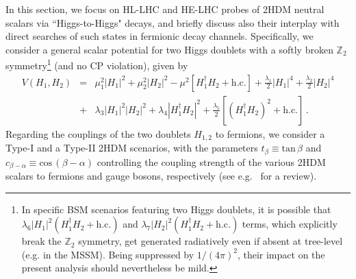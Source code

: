 In this section, we focus on HL-LHC and HE-LHC probes of 2HDM neutral scalars via ``Higgs-to-Higgs" decays, and briefly discuss also their interplay with direct searches of such states in fermionic decay channels. Specifically, we consider a general scalar potential for two Higgs doublets 
with a softly broken $\mathbb{Z}_2$ 
symmetry\footnote{In specific BSM scenarios featuring two Higgs doublets, it is possible that $\lambda_6 \left|H_1\right|^2 (H_1^{\dagger}H_2+\mathrm{h.c.})$  and $\lambda_7 \left|H_2\right|^2 (H_1^{\dagger}H_2+\mathrm{h.c.})$ terms, which explicitly break the $\mathbb{Z}_2$ symmetry, get generated radiatively even if absent at tree-level (e.g. in the MSSM). Being suppressed by $1/(4\pi)^2$, their impact on the present analysis should nevertheless be mild.} (and no CP violation), given by 
%
\begin{eqnarray}	
\label{2HDM_potential}
V(H_1,H_2) &= &\mu^2_1 \left|H_1\right|^2 + \mu^2_2\left|H_2\right|^2 - \mu^2\left[H_1^{\dagger}H_2+\mathrm{h.c.}\right] 
+\frac{\lambda_1}{2}\left|H_1\right|^4 +\frac{\lambda_2}{2}\left|H_2\right|^4 \nonumber \\
&+& \lambda_3 \left|H_1\right|^2\left|H_2\right|^2
+\lambda_4 \left|H_1^{\dagger}H_2\right|^2+ \frac{\lambda_5}{2}\left[\left(H_1^{\dagger}H_2\right)^2+\mathrm{h.c.}\right]\, . 
\end{eqnarray}
%
Regarding the couplings of the two doublets $H_{1,2}$ to fermions, we consider  
a Type-I and a Type-II 2HDM scenarios, with the parameters $t_{\beta} \equiv \mathrm{tan}\,\beta$ and $c_{\beta -\alpha} \equiv \mathrm{cos}\,(\beta-\alpha)$ controlling the coupling strength of the various 2HDM scalars to fermions and gauge bosons, respectively (see e.g.~\cite{Branco:2011iw} for a review).

